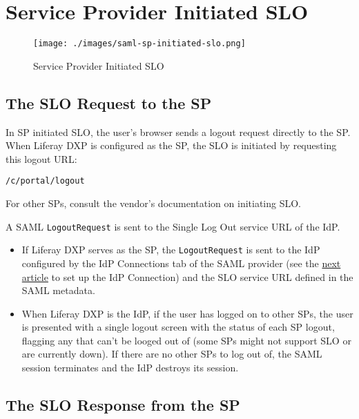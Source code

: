 \section{Service Provider Initiated
SLO}\label{service-provider-initiated-slo}

\begin{figure}
\centering
\texttt{[image: ./images/saml-sp-initiated-slo.png]}
\caption{Service Provider Initiated SLO}
\end{figure}

\subsection{The SLO Request to the SP}\label{the-slo-request-to-the-sp}

In SP initiated SLO, the user's browser sends a logout request directly
to the SP. When Liferay DXP is configured as the SP, the SLO is
initiated by requesting this logout URL:

\begin{verbatim}
/c/portal/logout
\end{verbatim}

For other SPs, consult the vendor's documentation on initiating SLO.

A SAML \texttt{LogoutRequest} is sent to the Single Log Out service URL
of the IdP.

\begin{itemize}
\item
  If Liferay DXP serves as the SP, the \texttt{LogoutRequest} is sent to
  the IdP configured by the IdP Connections tab of the SAML provider
  (see the
  \href{/docs/7-2/deploy/-/knowledge_base/d/setting-up-liferay-as-a-saml-identity-provider}{next
  article} to set up the IdP Connection) and the SLO service URL defined
  in the SAML metadata.
\item
  When Liferay DXP is the IdP, if the user has logged on to other SPs,
  the user is presented with a single logout screen with the status of
  each SP logout, flagging any that can't be looged out of (some SPs
  might not support SLO or are currently down). If there are no other
  SPs to log out of, the SAML session terminates and the IdP destroys
  its session.
\end{itemize}

\subsection{The SLO Response from the
SP}\label{the-slo-response-from-the-sp-1}

